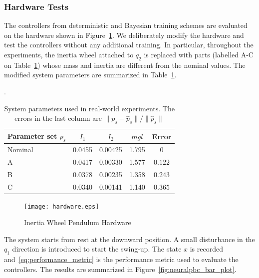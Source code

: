 \subsubsection{Hardware Tests} 

The controllers from deterministic and Bayesian training schemes are
evaluated on the hardware shown in Figure~\ref{fig:iwp_hardware}. 
%
We deliberately modify the hardware and test the controllers without any
additional training.
%
In particular, throughout the experiments, the inertia wheel attached to $q_2$
is replaced with parts (labelled A-C on Table~\ref{tab:modified_params}) whose
mass and inertia are different from the nominal values.
%
The modified system parameters are summarized in
Table~\ref{tab:modified_params}.
%
\begin{table}[H]
    \centering
    \caption{System parameters used in real-world experiments. The errors in the
    last column are $\|p_s - \hat{p}_s\| / \|\hat{p}_s\|$}.
    \begin{tabular}{lcccc}
    \toprule
    Parameter set $p_s$ & $I_1$ & $I_2$ & $mgl$ & Error \\
    \midrule
    Nominal & 0.0455 & 0.00425 & 1.795 & 0 \\
    A & 0.0417 & 0.00330 & 1.577 & $0.122$ \\
    B & 0.0378 & 0.00235 & 1.358 & $0.243$ \\
    C & 0.0340 & 0.00141 & 1.140 & $0.365$ \\
    \bottomrule
    \end{tabular}
    \label{tab:modified_params}
\end{table}
\begin{figure}[tb]
    \centering
    \texttt{[image: hardware.eps]}
    \caption{Inertia Wheel Pendulum Hardware}
    \label{fig:iwp_hardware}
\end{figure}

The system starts from rest at the downward position. 
%
A small disturbance in the $q_1$ direction is introduced to start the swing-up.
%
The state $x$ is recorded and~\eqref{eq:performance_metric} is the
performance metric used to evaluate the controllers. The results are
summarized in Figure~\ref{fig:neuralpbc_bar_plot}.
%

